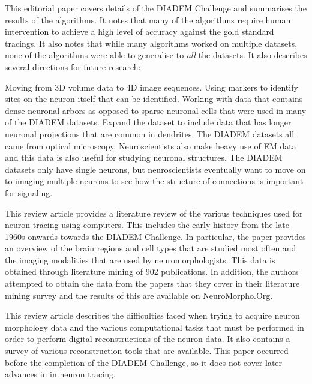 \documentclass[12pt]{article}
\begin{document}
\begin{enumerate}[label={}]
		This editorial paper covers details of the DIADEM
		Challenge and summarises the results of the
		algorithms. It notes that many of the algorithms
		require human intervention to achieve a high level
		of accuracy against the gold standard tracings. It
		also notes that while many algorithms worked on
		multiple datasets, none of the algorithms were
		able to generalise to \emph{all} the datasets.
		It also describes several directions for future
		research:
		\begin{enumerate}[label={}]
				Moving from 3D volume data to 4D
				image sequences.
				Using markers to identify sites on the
				neuron itself that can be identified.
			 Working with
				data that contains dense neuronal arbors
				as opposed to sparse neuronal cells that
				were used in many of the DIADEM datasets.
				Expand the dataset to include data
				that has longer neuronal
				projections that are common in
				dendrites.
				The DIADEM datasets all came from
				optical microscopy.
				Neuroscientists also make heavy
				use of EM data and this data is
				also useful for studying neuronal
				structures.
				The DIADEM datasets only have
				single neurons, but
				neuroscientists eventually want to
				move on to imaging multiple
				neurons to see how the structure
				of connections is important for
				signaling.
		\end{enumerate}

		This review article provides a literature review
		of the various techniques used for neuron tracing
		using computers. This includes the early history
		from the late 1960s onwards towards the DIADEM
		Challenge. In particular, the paper provides an
		overview of the brain regions and cell types that
		are studied most often and the imaging modalities
		that are used by neuromorphologists. This data is
		obtained through literature mining of 902
		publications. In addition, the authors attempted
		to obtain the data from the papers that they cover
		in their literature mining survey and the results
		of this are available on NeuroMorpho.Org.

		This review article describes the difficulties faced when
		trying to acquire neuron morphology data and the
		various computational tasks that must be
		performed in order to perform digital
		reconstructions of the neuron data. It also
		contains a survey of various reconstruction tools
		that are available. This paper occurred before the
		completion of the DIADEM Challenge, so it does not
		cover later advances in in neuron tracing.
\end{enumerate}
\end{document}
